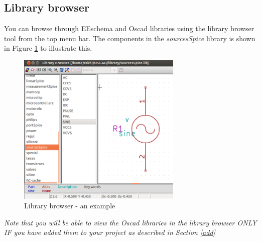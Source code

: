 \subsection{Library browser}
You can browse through EEschema and Oscad libraries using the library browser tool from the top menu bar. The components in the \textit{sourcesSpice} library is shown in Figure \ref{meas} to illustrate this.
\begin{figure}
\centering
\includegraphics[width=0.7\textwidth]{figures/libbrowse}
\caption{Library browser - an example}
\label{meas}
\end{figure}

\textit{Note that you will be able to view the Oscad libraries in the library browser ONLY IF you have added them to your project as described in Section \ref{add}}
